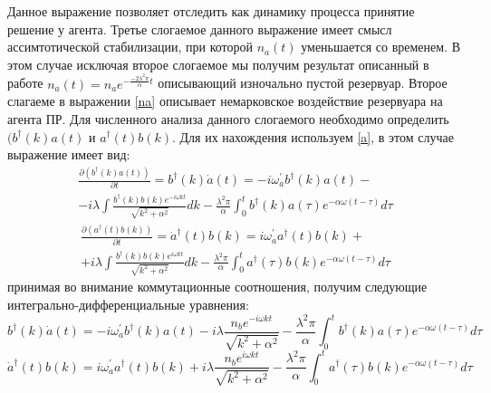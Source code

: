 Данное выражение позволяет отследить как динамику процесса принятие решение у агента.
Третье слогаемое данного выражение имеет смысл ассимтотической стабилизации, при которой $n_a(t)$ уменьшается со временем.
В этом случае исключая второе слогаемое мы получим результат описанный в работе
$n_a(t)=n_{a}e^{-\frac{-2\lambda^2\pi}{\alpha}t}$ описывающий изночально пустой резервуар.
Второе слагаеме в выражении \eqref{na} описывает немарковское воздействие резервуара на агента ПР.
Для численного анализа данного слогаемого необходимо определить $(b^{\dagger}(k) a(t)$ и $a^{\dagger}(t) b(k)$.
Для их нахождения используем \eqref{a}, в этом случае выражение имеет вид:
\begin{multline}\label{bcrossk_dota}
    \frac{\partial (b^{\dagger}(k) a(t))}{\partial t} =
    b^{\dagger}(k) \dot{a}(t) =
    -i \omega^{'}_{a} b^{\dagger}(k) a(t) - \\
    -i \lambda \int \frac{b^{\dagger}(k) b(k) e^{-i \omega k t}}{\sqrt{k^{2} + \alpha^2}} dk
    -\frac{\lambda^{2} \pi}{\alpha} \int_{0}^{t} b^{\dagger}(k) a(\tau) e^{- \alpha \omega (t - \tau)} d\tau
\end{multline}
\begin{multline}\label{dota_bk}
    \frac{\partial (a^{\dagger}(t) b(k))}{\partial t} =
    \dot{a}^{\dagger}(t) b(k) =
    i \omega^{'}_{a} a^{\dagger}(t) b(k) + \\
    + i \lambda \int \frac{b^{\dagger}(k) b(k) e^{i \omega k t}}{\sqrt{k^{2} + \alpha^2}} dk
    - \frac{\lambda^{2} \pi}{\alpha} \int_{0}^{t} a^{\dagger}(\tau) b(k) e^{- \alpha \omega (t - \tau)} d\tau
\end{multline}
принимая во внимание коммутационные соотношения, получим следующие интегрально-дифференциальные уравнения:
\begin{equation}\label{bcrossk_dota_less}
    b^{\dagger}(k) \dot{a}(t) =
    -i \omega^{'}_{a} b^{\dagger}(k) a(t)
    -i \lambda \frac{n_{b} e^{-i \omega k t}}{\sqrt{k^{2} + \alpha^2}}
    -\frac{\lambda^{2} \pi}{\alpha} \int_{0}^{t} b^{\dagger}(k) a(\tau) e^{- \alpha \omega (t - \tau)} d\tau
\end{equation}
\begin{equation}\label{dota_bk_less}
    \dot{a}^{\dagger}(t) b(k) =
    i \omega^{'}_{a} a^{\dagger}(t) b(k)
    + i \lambda \frac{n_{b} e^{i \omega k t}}{\sqrt{k^{2} + \alpha^2}}
    - \frac{\lambda^{2} \pi}{\alpha} \int_{0}^{t} a^{\dagger}(\tau) b(k) e^{- \alpha \omega (t - \tau)} d\tau
\end{equation}

